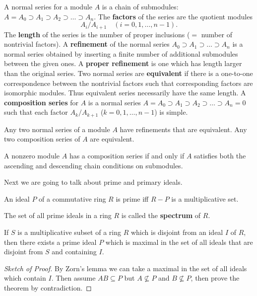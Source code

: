 \documentclass{article}
\newenvironment{sketch}[1][Sketch of Proof]{\begin{proof}[#1]}{\end{proof}}
\begin{document}
\begin{definition}
    A normal series for a module $A$ is a chain of submodules: $A = A_0 \supset A_1 \supset A_2 \supset \dots \supset A_n$. The \textbf{factors} of the series are the quotient modules
    $$A_i / A_{i+1} \quad (i = 0, 1, \dots, n - 1).$$
    The \textbf{length} of the series is the number of proper inclusions ($=$ number of nontrivial factors). A \textbf{refinement} of the normal series $A_0 \supset A_1 \supset \dots \supset A_n$ is a normal series obtained by inserting a finite number of additional submodules between the given ones. A \textbf{proper refinement} is one which has length larger than the original series. Two normal series are \textbf{equivalent} if there is a one-to-one correspondence between the nontrivial factors such that corresponding factors are isomorphic modules. Thus equivalent series necessarily have the same length. A \textbf{composition series} for $A$ is a normal series $A = A_0 \supset A_1 \supset A_2 \supset \dots \supset A_n = 0$ such that each factor $A_k / A_{k+1}$ ($k = 0, 1, \dots, n - 1$) is simple.
\end{definition}

\begin{theorem}
    Any two normal series of a module $A$ have refinements that are equivalent. Any two composition series of $A$ are equivalent.
\end{theorem}

\begin{theorem}
    A nonzero module $A$ has a composition series if and only if $A$ satisfies both the ascending and descending chain conditions on submodules.
\end{theorem}

Next we are going to talk about prime and primary ideals.

\begin{theorem}
    An ideal $P$ of a commutative ring $R$ is prime iff $R-P$ is a multiplicative set.
\end{theorem}
The set of all prime ideals in a ring $R$ is called the \textbf{spectrum} of $R$.

\begin{theorem}
    If $S$ is a multiplicative subset of a ring $R$ which is disjoint from an ideal $I$ of $R$, then there exists a prime ideal $P$ which is maximal in the set of all ideals that are disjoint from $S$ and containing $I$.
\end{theorem}
\begin{sketch}
By Zorn's lemma we can take a maximal in the set of all ideals which contain $I$. Then assume $AB\subseteq P$ but $A\nsubseteq P$ and $B \nsubseteq P$, then prove the theorem by contradiction.
\end{sketch}
\end{document}
